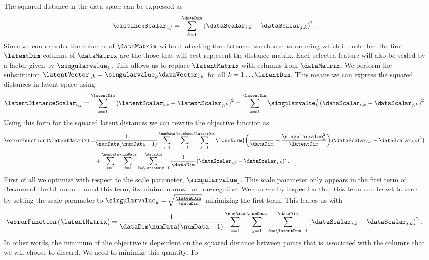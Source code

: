 The squared distance in the data space can be expressed as
\[
\distanceScalar_{i,j}=\sum_{k=1}^{\dataDim}\left(\dataScalar_{i,k}-\dataScalar_{j,k}\right)^{2}.
\]
Since we can re-order the columns of $\dataMatrix$ without affecting
the distances we choose an ordering which is such that the first
$\latentDim$ columns of $\dataMatrix$ are the those that will best
represent the distance matrix. Each selected feature will also be
scaled by a factor given by $\singularvalue_k$. This allows us to
replace $\latentMatrix$ with columns from $\dataMatrix$. We perform
the substitution
$\latentVector_{:,k}=\singularvalue_k\dataVector_{:,k}$ for all
$k=1\dots\latentDim$. This means we can express the squared distances
in latent space using
\[
\latentDistanceScalar_{i,j}=\sum_{k=1}^{\latentDim}\left(\latentScalar_{i,k}-\latentScalar_{j,k}\right)^{2}=\sum_{k=1}^{\latentDim}\singularvalue^2_k\left(\dataScalar_{i,k}-\dataScalar_{j,k}\right)^{2}
\]
Using this form for the squared latent distances we can rewrite the
objective function as
\begin{align}
\errorFunction\left(\latentMatrix\right) = & \frac{1}{\numData(\numData-1)}\sum_{i=1}^{\numData}\sum_{j=1}^{\numData}\sum_{k=1}^\latentDim\loneNorm{\left(\frac{1}{\dataDim}-\frac{\singularvalue_k^2}{\latentDim}\right)\left(\dataScalar_{i,k}-\dataScalar_{j,k}\right)^{2}} \nonumber \\&+  \sum_{i=1}^{\numData}\sum_{j=1}^{\numData}\sum_{k=\latentDim+1}^{\dataDim}\frac{1}{\dataDim}\left(\dataScalar_{i,k}-\dataScalar_{j,k}\right)^{2}.\label{eq:distObjectiveExpanded}
\end{align}
First of all we optimize with respect to the scale parameter,
$\singularvalue_k$. This scale parameter only appears in the first
term of . Because of the L1 norm
around this term, its minimum must be non-negative. We can see by
inspection that this term can be set to zero by setting the scale
parameter to
$\singularvalue_k=\sqrt{\frac{\latentDim}{\dataDim}}$ minimizing the first term. This leaves us with
\[
\errorFunction\left(\latentMatrix\right)  = \frac{1}{\dataDim\numData(\numData-1)}\sum_{i=1}^{\numData}\sum_{j=1}^{\numData}\sum_{k=\latentDim+1}^{\dataDim}\left(\dataScalar_{i,k}-\dataScalar_{j,k}\right)^{2}.
\]
In other words, the minimum of the objective is dependent on the
squared distance between points that is associated with the columns
that we will choose to discard. We need to minimize this quantity. To
